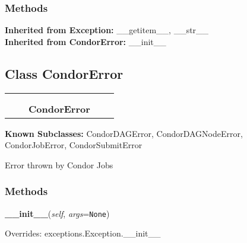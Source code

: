   \subsubsection{Methods}

  \noindent\textbf{Inherited from Exception:}
    \_\_getitem\_\_,
    \_\_str\_\_
    \\
  \noindent\textbf{Inherited from CondorError:}
    \_\_init\_\_


\subsection{Class CondorError}

    \label{pipeline:CondorError}
\begin{tabular}{cccccc}
\multicolumn{2}{r}{\settowidth{\BCL}{exceptions.Exception}\multirow{2}{\BCL}{exceptions.Exception}}
&&
  \\\cline{3-3}
  &&\multicolumn{1}{c|}{}
&&
  \\
&&\multicolumn{2}{l}{\textbf{CondorError}}
\end{tabular}

\textbf{Known Subclasses:}
CondorDAGError,
    CondorDAGNodeError,
    CondorJobError,
    CondorSubmitError

Error thrown by Condor Jobs



  \subsubsection{Methods}

    \label{pipeline:CondorError:__init__}
    \vspace{0.5ex}

    \noindent\begin{boxedminipage}{\textwidth}

    \raggedright \textbf{\_\_init\_\_}(\textit{self}, \textit{args}=\texttt{N\-o\-n\-e\-})

      Overrides: exceptions.Exception.\_\_init\_\_

    \end{boxedminipage}

